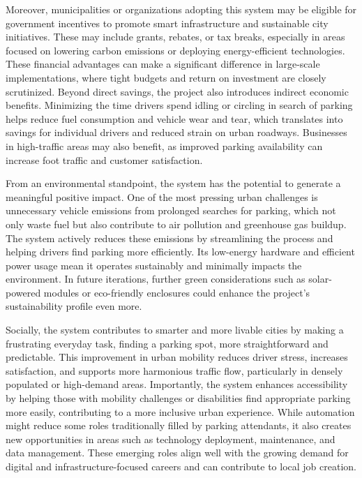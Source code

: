 \documentclass[conference]{IEEEtran}
\begin{document}
Moreover, municipalities or organizations adopting this system may be eligible for government incentives to promote smart infrastructure and sustainable city initiatives. These may include grants, rebates, or tax breaks, especially in areas focused on lowering carbon emissions or deploying energy-efficient technologies. These financial advantages can make a significant difference in large-scale implementations, where tight budgets and return on investment are closely scrutinized. Beyond direct savings, the project also introduces indirect economic benefits. Minimizing the time drivers spend idling or circling in search of parking helps reduce fuel consumption and vehicle wear and tear, which translates into savings for individual drivers and reduced strain on urban roadways. Businesses in high-traffic areas may also benefit, as improved parking availability can increase foot traffic and customer satisfaction.

From an environmental standpoint, the system has the potential to generate a meaningful positive impact. One of the most pressing urban challenges is unnecessary vehicle emissions from prolonged searches for parking, which not only waste fuel but also contribute to air pollution and greenhouse gas buildup. The system actively reduces these emissions by streamlining the process and helping drivers find parking more efficiently. Its low-energy hardware and efficient power usage mean it operates sustainably and minimally impacts the environment. In future iterations, further green considerations such as solar-powered modules or eco-friendly enclosures could enhance the project's sustainability profile even more.

Socially, the system contributes to smarter and more livable cities by making a frustrating everyday task, finding a parking spot, more straightforward and predictable. This improvement in urban mobility reduces driver stress, increases satisfaction, and supports more harmonious traffic flow, particularly in densely populated or high-demand areas. Importantly, the system enhances accessibility by helping those with mobility challenges or disabilities find appropriate parking more easily, contributing to a more inclusive urban experience. While automation might reduce some roles traditionally filled by parking attendants, it also creates new opportunities in areas such as technology deployment, maintenance, and data management. These emerging roles align well with the growing demand for digital and infrastructure-focused careers and can contribute to local job creation.
\end{document}
